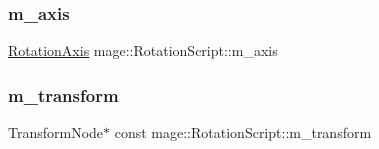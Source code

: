 \subsubsection{\texorpdfstring{m\+\_\+axis}{m\_axis}}
{\footnotesize\ttfamily \hyperlink{classmage_1_1_rotation_script_ad06cf896ce6dfe4f6676b263d15b4ee9}{Rotation\+Axis} mage\+::\+Rotation\+Script\+::m\+\_\+axis\hspace{0.3cm}{\ttfamily [private]}}

\hypertarget{classmage_1_1_rotation_script_a9dd84c2b928dece60bc1d72a16b20030}{}\label{classmage_1_1_rotation_script_a9dd84c2b928dece60bc1d72a16b20030} 
\subsubsection{\texorpdfstring{m\+\_\+transform}{m\_transform}}
{\footnotesize\ttfamily Transform\+Node$\ast$ const mage\+::\+Rotation\+Script\+::m\+\_\+transform\hspace{0.3cm}{\ttfamily [private]}}

